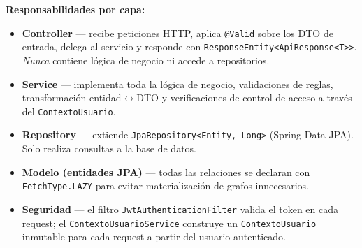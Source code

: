 \documentclass[11pt,a4paper,oneside]{article}
\newcommand{\code}[1]{\texttt{\small #1}}
\begin{document}
\begin{center}
\end{center}

\textbf{Responsabilidades por capa:}

\begin{itemize}[leftmargin=*]
  \item \textbf{Controller} — recibe peticiones HTTP, aplica \code{@Valid} sobre los DTO
        de entrada, delega al servicio y responde con \code{ResponseEntity<ApiResponse<T>>}.
        \emph{Nunca} contiene lógica de negocio ni accede a repositorios.
  \item \textbf{Service} — implementa toda la lógica de negocio, validaciones de reglas,
        transformación entidad$\leftrightarrow$DTO y verificaciones de control de acceso
        a través del \code{ContextoUsuario}.
  \item \textbf{Repository} — extiende \code{JpaRepository<Entity, Long>} (Spring Data JPA).
        Solo realiza consultas a la base de datos.
  \item \textbf{Modelo (entidades JPA)} — todas las relaciones se declaran con
        \code{FetchType.LAZY} para evitar materialización de grafos innecesarios.
  \item \textbf{Seguridad} — el filtro \code{JwtAuthenticationFilter} valida el token en cada
        request; el \code{ContextoUsuarioService} construye un \code{ContextoUsuario} inmutable
        para cada request a partir del usuario autenticado.
\end{itemize}
\end{document}
